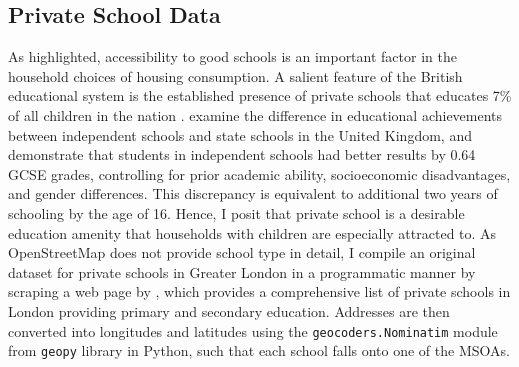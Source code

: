 \documentclass{article}
\begin{document}
\subsection{Private School Data} \label{subsection:school}
As \citet{Niu2016ModelingDemand} highlighted, accessibility to good schools is an important factor in the household choices of housing consumption. A salient feature of the British educational system is the established presence of private schools that educates 7\% of all children in the nation \citep{Green2019WhatProblem}. \citet{Ndaji2016ACouncil} examine the difference in educational achievements between independent schools and state schools in the United Kingdom, and demonstrate that students in independent schools had better results by 0.64 GCSE grades, controlling for prior academic ability, socioeconomic disadvantages, and gender differences. This discrepancy is equivalent to additional two years of schooling by the age of 16. Hence, I posit that private school is a desirable education amenity that households with children are especially attracted to. As OpenStreetMap does not provide school type in detail, I compile an original dataset for private schools in Greater London in a programmatic manner by scraping a web page by \citet{IndependentSchoolsCouncil2019IndepnendentArea}, which provides a comprehensive list of private schools in London providing primary and secondary education. Addresses are then converted into longitudes and latitudes using the \texttt{geocoders.Nominatim} module from \texttt{geopy} library in Python, such that each school falls onto one of the MSOAs.
\end{document}
